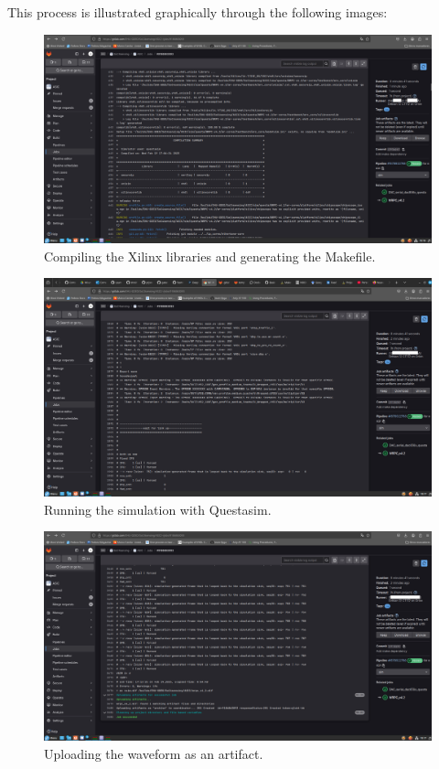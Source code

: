 \vspace{1mm}

\noindent This process is illustrated graphically through the following images:

\begin{figure}[H]
\centering
\includegraphics[width=14cm]{figures/wrpc_ci_1.png}
\caption{Compiling the Xilinx libraries and generating the Makefile.}
\label{fig:wrpc-ci-1}
\end{figure}

\begin{figure}[H]
\centering
\includegraphics[width=14cm]{figures/wrpc_ci_2.png}
\caption{Running the simulation with Questasim.}
\label{fig:wrpc-ci-2}
\end{figure}

\begin{figure}[H]
\centering
\includegraphics[width=14cm]{figures/wrpc_ci_3.png}
\caption{Uploading the waveform as an artifact.}
\label{fig:wrpc-ci-3}
\end{figure}

